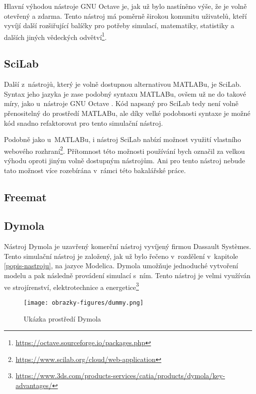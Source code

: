Hlavní výhodou nástroje GNU Octave je, jak už bylo nastíněno výše, že je volně otevřený a zdarma. Tento nástroj má poměrně širokou komunitu uživatelů, kteří vyvíjí další rozšiřující balíčky pro potřeby simulací, matematiky, statistiky a dalších jiných vědeckých odvětví\footnote{\url{https://octave.sourceforge.io/packages.php}}.


\subsection{SciLab}
\label{scilab-desc}
Další z~nástrojů, který je volně dostupnou alternativou MATLABu, je SciLab. Syntax jeho jazyka je zase podobný syntaxu MATLABu, ovšem už ne do takové míry, jako u~nástroje GNU Octave \cite{Gilberto}. Kód napsaný pro SciLab tedy není volně přenositelný do prostředí MATLABu, ale díky velké podobnosti syntaxe je možné kód snadno refaktorovat pro tento simulační nástroj.

Podobně jako u~MATLABu, i nástroj SciLab nabízí možnost využití vlastního webového rozhraní\footnote{\url{https://www.scilab.org/cloud/web-application}}. Přítomnost této možnosti používání bych označil za velkou výhodu oproti jiným volně dostupným nástrojům. Ani pro tento nástroj nebude tato možnost více rozebírána v~rámci této bakalářské práce.


\subsection{Freemat}
\label{freemat-desc}

\subsection{Dymola}
\label{dymola-desc}

Nástroj Dymola je uzavřený komerční nástroj vyvíjený firmou Dassault Systèmes. Tento simulační nástroj je založený, jak už bylo řečeno v~rozdělení v~kapitole \ref{popis-nastroju}, na jazyce Modelica. Dymola umožňuje jednoduché vytvoření modelu a pak následně provádení simulací s~ním. Tento nástroj je velmi využíván ve strojírenství, elektrotechnice a energetice\footnote{\url{https://www.3ds.com/products-services/catia/products/dymola/key-advantages/}}

\begin{figure}
    \centering
    \texttt{[image: obrazky-figures/dummy.png]}
    \caption{Ukázka prostředí Dymola}
    \label{fig:dymola}
\end{figure}

